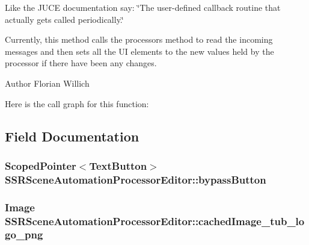 Like the J\-U\-C\-E documentation say\-: \char`\"{}\-The user-\/defined callback routine that
actually gets called periodically.\char`\"{}

Currently, this method calls the processors method to read the incoming messages and then sets all the U\-I elements to the new values held by the processor if there have been any changes.

\begin{DoxyAuthor}{Author}
Florian Willich 
\end{DoxyAuthor}


Here is the call graph for this function\-:




\subsection{Field Documentation}
\hypertarget{classSSRSceneAutomationProcessorEditor_a04620ea403036ee702bac71bf3966120}{
\subsubsection[{bypass\-Button}]{\setlength{\rightskip}{0pt plus 5cm}Scoped\-Pointer$<$Text\-Button$>$ S\-S\-R\-Scene\-Automation\-Processor\-Editor\-::bypass\-Button\hspace{0.3cm}{\ttfamily [private]}}}\label{classSSRSceneAutomationProcessorEditor_a04620ea403036ee702bac71bf3966120}
\hypertarget{classSSRSceneAutomationProcessorEditor_a41cd6db52b2b7bfce4c888ab81bc527b}{
\subsubsection[{cached\-Image\-\_\-tub\-\_\-logo\-\_\-png}]{\setlength{\rightskip}{0pt plus 5cm}Image S\-S\-R\-Scene\-Automation\-Processor\-Editor\-::cached\-Image\-\_\-tub\-\_\-logo\-\_\-png\hspace{0.3cm}{\ttfamily [private]}}}\label{classSSRSceneAutomationProcessorEditor_a41cd6db52b2b7bfce4c888ab81bc527b}
